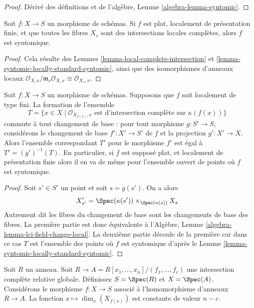 \begin{proof}
Dérivé des définitions et
de l'algèbre, Lemme \ref{algebra-lemma-syntomic}.
\end{proof}

\begin{lemma}
\label{lemma-syntomic-flat-fibres}
Soit $f : X \to S$ un morphisme de schémas. Si $f$
est plat, localement de présentation finie, et que toutes les fibres $X_s$
sont des intersections locales complètes, alors $f$ est
syntomique.
\end{lemma}

\begin{proof}
Cela résulte des Lemmes
\ref{lemma-local-complete-intersection} et
\ref{lemma-syntomic-locally-standard-syntomic}, ainsi que des
isomorphismes d'anneaux locaux
$
\mathcal{O}_{X, x}/\mathfrak m_s \mathcal{O}_{X, x}
\cong
\mathcal{O}_{X_s, x}
$.
\end{proof}

\begin{lemma}
\label{lemma-set-points-where-fibres-lci}
Soit $f : X \to S$ un morphisme de schémas. Supposons
que $f$ soit localement de type fini. La formation de l'ensemble
$$
T = \{x \in X \mid \mathcal{O}_{X_{f(x)}, x}
\text{ est d'intersection complète sur }\kappa(f(x))\}
$$
commute à tout changement de base :
pour tout morphisme $g : S' \to S$, considérons
le changement de base $f' : X' \to S'$ de $f$ et la
projection $g' : X' \to X$. Alors l'ensemble correspondant $T'$
pour le morphisme $f'$ est égal à $T' = (g')^{-1}(T)$. En particulier,
si $f$ est supposé plat, et localement de présentation finie
alors il en va de même pour l'ensemble ouvert de points où $f$
est syntomique.
\end{lemma}

\begin{proof}
Soit $s' \in S'$ un point et soit $s = g(s')$. On a alors
$$
X'_{s'} =
\Spec(\kappa(s')) \times_{\Spec(\kappa(s))} X_s
$$
Autrement dit les fibres du changement de base sont les changements
de base des fibres. La première partie
est donc équivalente à l'Algèbre, Lemme \ref{algebra-lemma-lci-field-change-local}.
La deuxième partie découle de la première car dans
ce cas $T$ est l'ensemble des points où $f$
est syntomique d'après le Lemme \ref{lemma-syntomic-locally-standard-syntomic}.
\end{proof}

\begin{lemma}
\label{lemma-standard-syntomic-relative-dimension}
Soit $R$ un
anneau. Soit $R \to A = R[x_1, \ldots, x_n]/(f_1, \ldots, f_c)$ une intersection complète relative
globale. Définissez $S = \Spec(R)$ et $X = \Spec(A)$.
Considérons le morphisme $f : X \to S$
associé à l'homomorphisme d'anneaux $R \to A$.
La fonction $x \mapsto \dim_x(X_{f(x)})$ est constante de valeur $n - c$.
\end{lemma}

